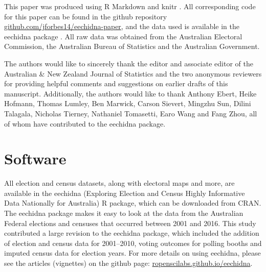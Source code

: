 \documentclass[
  times, doublespace]{anzsauth}
\begin{document}
This paper was produced using \textsf{R Markdown} \citep{rmarkdown} and \textsf{knitr} \citep{knitr}. All corresponding code for this paper can be found in the github repository \url{github.com/jforbes14/eechidna-paper}, and the data used is available in the \textsf{eechidna} package \citep{eechidna}. All raw data was obtained from the Australian Electoral Commission, the Australian Bureau of Statistics and the Australian Government.

The authors would like to sincerely thank the editor and associate editor of the Australian \& New Zealand Journal of Statistics and the two anonymous reviewers for providing helpful comments and suggestions on earlier drafts of this manuscript. Additionally, the authors would like to thank Anthony Ebert, Heike Hofmann, Thomas Lumley, Ben Marwick, Carson Sievert, Mingzhu Sun, Dilini Talagala, Nicholas Tierney, Nathaniel Tomasetti, Earo Wang and Fang Zhou, all of whom have contributed to the \textsf{eechidna} package.

\hypertarget{software}{%
\section{Software}\label{software}}

All election and census datasets, along with electoral maps and more, are available in the \textsf{eechidna} (Exploring Election and Census Highly Informative Data Nationally for Australia) \textsf{R} package, which can be downloaded from CRAN. The \textsf{eechidna} package makes it easy to look at the data from the Australian Federal elections and censuses that occurred between 2001 and 2016. This study contributed a large revision to the \textsf{eechidna} package, which included the addition of election and census data for 2001--2010, voting outcomes for polling booths and imputed census data for election years. For more details on using \textsf{eechidna}, please see the articles (vignettes) on the github page: \url{ropenscilabs.github.io/eechidna}.

\renewcommand\refname{References}
  
\end{document}
